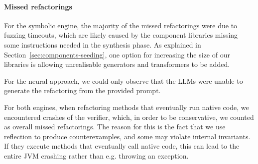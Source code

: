 \documentclass[sigconf]{acmart}
\begin{document}
\paragraph{Missed refactorings}
%
%
%
For the symbolic engine, the majority of the missed refactorings were due to fuzzing timeouts, which are likely
caused by the component libraries missing some
instructions needed in the synthesis phase.
As explained in Section~\ref{sec:components-seeding}, one option
for increasing the size of our libraries
is allowing unrealisable generators and transformers to
be added.

For the neural approach, we could only observe that the LLMs were unable to generate the refactoring from the provided prompt.

For both engines, when refactoring methods that eventually run native code, we encountered crashes of the verifier, which, in order to be conservative, we counted as overall missed refactorings.
The reason for this is the fact that we use reflection to produce counterexamples,
and some may violate internal invariants.
If they execute methods that eventually call native code, this can lead to the entire JVM
crashing rather than e.g. throwing an exception. %
\end{document}
